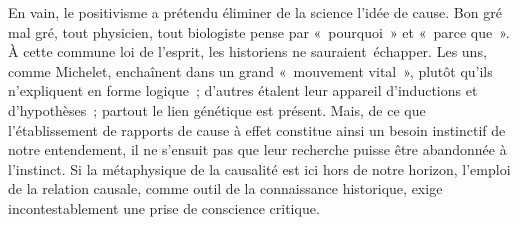 \documentclass[french,twoside]{book} %
\newcommand{\astermono}{\medskip\centerline{\color{rubric}\large\selectfont{\syms ✻}}\medskip\par}%
\begin{document}
\noindent  {}
\label{p99} En vain, le positivisme a prétendu éliminer de la science l’idée de cause. Bon gré mal gré, tout physicien, tout biologiste pense par « pourquoi » et « parce que ». À cette commune loi de l’esprit, les historiens ne sauraient échapper. Les uns, comme Michelet, enchaînent dans un grand « mouve­ment vital », plutôt qu’ils n’expliquent en forme logique ; d’autres étalent leur appareil d’inductions et d’hypothèses ; partout le lien génétique est présent. Mais, de ce que l’établissement de rapports de cause à effet constitue ainsi un besoin instinctif de notre entendement, il ne s’ensuit pas que leur recherche puisse être abandonnée à l’instinct. Si la méta­physique de la causalité est ici hors de notre horizon, l’emploi de la relation causale, comme outil de la connaissance historique, exige incontestable­ment une prise de conscience critique.\par

\astermono
\end{document}
